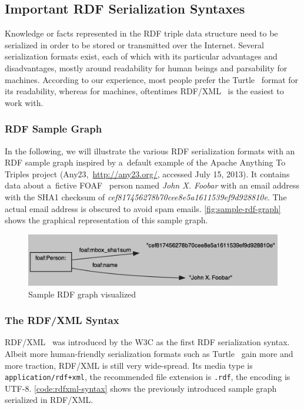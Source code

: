 \subsection{Important RDF Serialization Syntaxes}

Knowledge or facts represented in the RDF triple data structure
need to be serialized in order to be stored
or transmitted over the Internet.
Several serialization formats exist,
each of which with its particular advantages
and disadvantages, mostly around readability for human beings
and parsability for machines.
According to our experience, most people prefer the Turtle~\cite{prudhommeaux2013turtle}
format for its readability,
whereas for machines, oftentimes RDF/XML~\cite{beckett2004rdfxml}
is the easiest to work with.

\subsubsection{RDF Sample Graph}
In the following, we will illustrate the various
RDF serialization formats with an RDF sample graph
inspired by a~default example of the Apache Anything To Triples project
(Any23,~\url{http://any23.org/}, accessed July 15, 2013).
It contains data about a~fictive FOAF~\cite{brickley2010foaf}
person named \emph{John X. Foobar}
with an email address with the SHA1 checksum of
\emph{cef817456278b70cee8e5a1611539\-ef9d928810e}.
The actual email address is obscured to avoid spam emails.
\autoref{fig:sample-rdf-graph} shows the graphical representation
of this sample graph.

\begin{figure}[!ht]
\centering
  \includegraphics[width=\linewidth]{sample-rdf-graph.png} 
  \caption{Sample RDF graph visualized}
  \label{fig:sample-rdf-graph}
\end{figure}

\subsubsection{The RDF/XML Syntax}

RDF/XML~\cite{beckett2004rdfxml} was introduced by
the W3C as the first RDF serialization syntax.
Albeit more human-friendly serialization formats
such as Turtle~\cite{prudhommeaux2013turtle}
gain more and more traction,
RDF/XML is still very wide-spread.
Its media type is \texttt{application/rdf+xml},
the recommended file extension is \texttt{.rdf},
the encoding is UTF-8.
\autoref{code:rdfxml-syntax} shows the previously
introduced sample graph serialized in RDF/XML.

